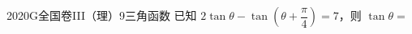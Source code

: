
\begin{problem}{2020}{G}{全国卷III（理）}{9}{三角函数}
已知 $ 2\tan\theta - \tan\left(\theta + \dfrac{\pi}{4}\right) = 7 $，则 $ \tan\theta = $
\begin{choices}
\end{choices}
\end{problem}

\begin{answer}

\end{answer}

\begin{solutions}

\end{solutions}